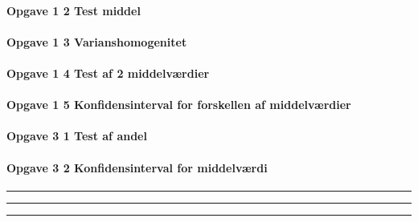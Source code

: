 \documentclass[]{book}
\let\oldparagraph\paragraph
\renewcommand{\paragraph}[1]{\oldparagraph{#1}\mbox{}}
\begin{document}
\hypertarget{opgave-1-2-test-middel}{%
\paragraph{Opgave 1 2 Test middel}\label{opgave-1-2-test-middel}}

\hypertarget{opgave-1-3-varianshomogenitet}{%
\paragraph{Opgave 1 3 Varianshomogenitet}\label{opgave-1-3-varianshomogenitet}}

\hypertarget{opgave-1-4-test-af-2-middelvrdier}{%
\paragraph{Opgave 1 4 Test af 2 middelværdier}\label{opgave-1-4-test-af-2-middelvrdier}}

\hypertarget{opgave-1-5-konfidensinterval-for-forskellen-af-middelvrdier}{%
\paragraph{Opgave 1 5 Konfidensinterval for forskellen af middelværdier}\label{opgave-1-5-konfidensinterval-for-forskellen-af-middelvrdier}}

\hypertarget{opgave-3-1-test-af-andel}{%
\paragraph{Opgave 3 1 Test af andel}\label{opgave-3-1-test-af-andel}}

\hypertarget{opgave-3-2-konfidensinterval-for-middelvrdi}{%
\paragraph{Opgave 3 2 Konfidensinterval for middelværdi}\label{opgave-3-2-konfidensinterval-for-middelvrdi}}

\begin{center}\rule{0.5\linewidth}{\linethickness}\end{center}

\begin{center}\rule{0.5\linewidth}{\linethickness}\end{center}

\begin{center}\rule{0.5\linewidth}{\linethickness}\end{center}
\end{document}
